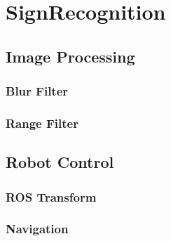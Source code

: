 \chapter{SignRecognition}
\graphicspath{{./Software/img/}}
 
\section{Image Processing}
\subsection{Blur Filter}
\subsection{Range Filter}



\section{Robot Control}
\subsection{ROS Transform}
\subsection{Navigation}
